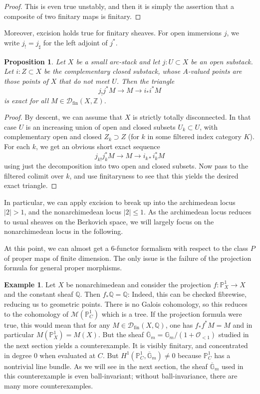 \documentclass[11pt]{amsart}
\numberwithin{equation}{section}
\numberwithin{theorem}{section}
\newtheorem{proposition}[theorem]{Proposition}
\theoremstyle{definition}
\newtheorem{example}[theorem]{Example}
\begin{document}
\begin{proof} This is even true unstably, and then it is simply the assertion that a composite of two finitary maps is finitary.
\end{proof}

Moreover, excision holds true for finitary sheaves. For open immersions $j$, we write $j_!=j_\sharp$ for the left adjoint of $j^\ast$.

\begin{proposition} Let $X$ be a small arc-stack and let $j: U\subset X$ be an open substack. Let $i: Z\subset X$ be the complementary closed substack, whose $A$-valued points are those points of $X$ that do not meet $U$. Then the triangle
\[
j_! j^\ast M\to M\to i_\ast i^\ast M
\]
is exact for all $M\in \mathcal D_{\mathrm{fin}}(X,\mathbb Z)$.
\end{proposition}

\begin{proof} By descent, we can assume that $X$ is strictly totally disconnected. In that case $U$ is an increasing union of open and closed subsets $U_k\subset U$, with complementary open and closed $Z_k\supset Z$ (for $k$ in some filtered index category $K$). For each $k$, we get an obvious short exact sequence
\[
j_{k!} j_k^\ast M\to M\to i_{k\ast} i_k^\ast M
\]
using just the decomposition into two open and closed subsets. Now pass to the filtered colimit over $k$, and use finitaryness to see that this yields the desired exact triangle.
\end{proof}

In particular, we can apply excision to break up into the archimedean locus $|2|>1$, and the nonarchimedean locus $|2|\leq 1$. As the archimedean locus reduces to usual sheaves on the Berkovich space, we will largely focus on the nonarchimedean locus in the following.

At this point, we can almost get a $6$-functor formalism with respect to the class $P$ of proper maps of finite dimension. The only issue is the failure of the projection formula for general proper morphisms.

\begin{example} Let $X$ be nonarchimedean and consider the projection $f: \mathbb P^1_X\to X$ and the constant sheaf $\mathbb Q$. Then $f_\ast \mathbb Q=\mathbb Q$: Indeed, this can be checked fibrewise, reducing us to geometric points. There is no Galois cohomology, so this reduces to the cohomology of $\mathcal M(\mathbb P^1_C)$ which is a tree. If the projection formula were true, this would mean that for any $M\in \mathcal D_{\mathrm{fin}}(X,\mathbb Q)$, one has $f_\ast f^\ast M=M$ and in particular $M(\mathbb P^1_X)=M(X)$. But the sheaf $\overline{\mathbb G}_m = \mathbb G_m/(1+\mathcal O_{<1})$ studied in the next section yields a counterexample. It is visibly finitary, and concentrated in degree $0$ when evaluated at $C$. But $H^1(\mathbb P^1_C,\overline{\mathbb G}_m)\neq 0$ because $\mathbb P^1_C$ has a nontrivial line bundle. As we will see in the next section, the sheaf $\overline{\mathbb G}_m$ used in this counterexample is even ball-invariant; without ball-invariance, there are many more counterexamples.
\end{example}
\end{document}
